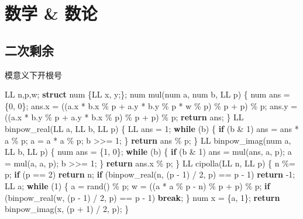 \documentclass[
]{article}
\newenvironment{Shaded}{}{}
\newcommand{\ControlFlowTok}[1]{\textcolor[rgb]{0.00,0.44,0.13}{\textbf{#1}}}
\newcommand{\DecValTok}[1]{\textcolor[rgb]{0.25,0.63,0.44}{#1}}
\newcommand{\KeywordTok}[1]{\textcolor[rgb]{0.00,0.44,0.13}{\textbf{#1}}}
\newcommand{\NormalTok}[1]{#1}
\begin{document}
\hypertarget{ux6570ux5b66-ux6570ux8bba}{%
\section{数学 \& 数论}\label{ux6570ux5b66-ux6570ux8bba}}

\hypertarget{ux4e8cux6b21ux5269ux4f59}{%
\subsection{二次剩余}\label{ux4e8cux6b21ux5269ux4f59}}

模意义下开根号

\begin{Shaded}
\begin{Highlighting}[]
\NormalTok{LL n,p,w;}
\KeywordTok{struct}\NormalTok{ num \{LL x, y;\};}
\NormalTok{num mul(num a, num b, LL p)}
\NormalTok{\{}
\NormalTok{    num ans = \{}\DecValTok{0}\NormalTok{, }\DecValTok{0}\NormalTok{\};}
\NormalTok{    ans.x = ((a.x * b.x \% p + a.y * b.y \% p * w \% p) \% p + p) \% p;}
\NormalTok{    ans.y = ((a.x * b.y \% p + a.y * b.x \% p) \% p + p) \% p;}
    \ControlFlowTok{return}\NormalTok{ ans;}
\NormalTok{\}}
\NormalTok{LL binpow\_real(LL a, LL b, LL p)}
\NormalTok{\{ }
\NormalTok{    LL ans = }\DecValTok{1}\NormalTok{;}
    \ControlFlowTok{while}\NormalTok{ (b)}
\NormalTok{    \{}
        \ControlFlowTok{if}\NormalTok{ (b \& }\DecValTok{1}\NormalTok{) ans = ans * a \% p;}
\NormalTok{        a = a * a \% p;}
\NormalTok{        b \textgreater{}\textgreater{}= }\DecValTok{1}\NormalTok{;}
\NormalTok{    \}}
    \ControlFlowTok{return}\NormalTok{ ans \% p;}
\NormalTok{\}}
\NormalTok{LL binpow\_imag(num a, LL b, LL p)}
\NormalTok{\{  }
\NormalTok{    num ans = \{}\DecValTok{1}\NormalTok{, }\DecValTok{0}\NormalTok{\};}
    \ControlFlowTok{while}\NormalTok{ (b)}
\NormalTok{    \{}
        \ControlFlowTok{if}\NormalTok{ (b \& }\DecValTok{1}\NormalTok{) ans = mul(ans, a, p);}
\NormalTok{        a = mul(a, a, p);}
\NormalTok{        b \textgreater{}\textgreater{}= }\DecValTok{1}\NormalTok{;}
\NormalTok{    \}}
    \ControlFlowTok{return}\NormalTok{ ans.x \% p;}
\NormalTok{\}}
\NormalTok{LL cipolla(LL n, LL p)}
\NormalTok{\{}
\NormalTok{    n \%= p;}
    \ControlFlowTok{if}\NormalTok{ (p == }\DecValTok{2}\NormalTok{) }\ControlFlowTok{return}\NormalTok{ n;}
    \ControlFlowTok{if}\NormalTok{ (binpow\_real(n, (p {-} }\DecValTok{1}\NormalTok{) / }\DecValTok{2}\NormalTok{, p) == p {-} }\DecValTok{1}\NormalTok{) }\ControlFlowTok{return}\NormalTok{ {-}}\DecValTok{1}\NormalTok{;}
\NormalTok{    LL a;}
    \ControlFlowTok{while}\NormalTok{ (}\DecValTok{1}\NormalTok{)}
\NormalTok{    \{ }
\NormalTok{        a = rand() \% p;}
\NormalTok{        w = ((a * a \% p {-} n) \% p + p) \% p;}
        \ControlFlowTok{if}\NormalTok{ (binpow\_real(w, (p {-} }\DecValTok{1}\NormalTok{) / }\DecValTok{2}\NormalTok{, p) == p {-} }\DecValTok{1}\NormalTok{) }\ControlFlowTok{break}\NormalTok{;}
\NormalTok{    \}}
\NormalTok{    num x = \{a, }\DecValTok{1}\NormalTok{\};}
    \ControlFlowTok{return}\NormalTok{ binpow\_imag(x, (p + }\DecValTok{1}\NormalTok{) / }\DecValTok{2}\NormalTok{, p);}
\NormalTok{\}}


\end{Highlighting}
\end{Shaded}
\end{document}
